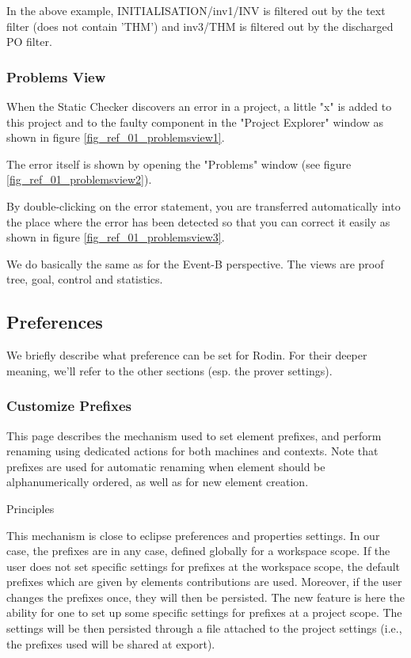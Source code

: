 In the above example, INITIALISATION/inv1/INV is filtered out by the text filter (does not contain 'THM') and inv3/THM is filtered out by the discharged PO filter. 

\subsubsection{Problems View}
\label{reference_01_the_problems_view}

When the Static Checker discovers an error in a project, a little "x" is added to this project and to the faulty component in the "Project Explorer" window as shown in figure \ref{fig_ref_01_problemsview1}.

The error itself is shown by opening the "Problems" window (see figure \ref{fig_ref_01_problemsview2}). 

By double-clicking on the error statement, you are transferred automatically into the place where the error has been detected so that you can correct it easily as shown in figure \ref{fig_ref_01_problemsview3}. 

We do basically the same as for the Event-B perspective. The views are proof tree, goal, control and statistics.
 
\subsection{Preferences}

We briefly describe what preference can be set for Rodin. For their deeper meaning, we'll refer to the other sections (esp. the prover settings).

\subsubsection{Customize Prefixes}


This page describes the mechanism used to set element prefixes, and perform renaming using dedicated actions for both machines and contexts. Note that prefixes are used for automatic renaming when element should be alphanumerically ordered, as well as for new element creation. 

Principles

This mechanism is close to eclipse preferences and properties settings. In our case, the prefixes are in any case, defined globally for a workspace scope. If the user does not set specific settings for prefixes at the workspace scope, the default prefixes which are given by elements contributions are used. Moreover, if the user changes the prefixes once, they will then be persisted. The new feature is here the ability for one to set up some specific settings for prefixes at a project scope. The settings will be then persisted through a file attached to the project settings (i.e., the prefixes used will be shared at export).

